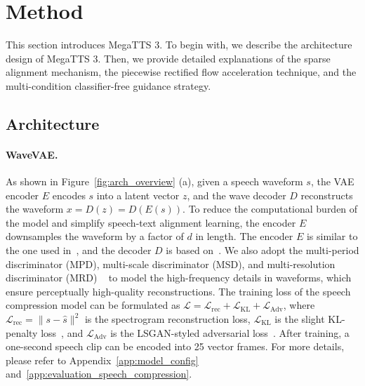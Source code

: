 \section{Method}
\label{method}
This section introduces MegaTTS 3. To begin with, we describe the architecture design of MegaTTS 3. Then, we provide detailed explanations of the sparse alignment mechanism, the piecewise rectified flow acceleration technique, and the multi-condition classifier-free guidance strategy.

\subsection{Architecture}
\label{method:main_arch}
\paragraph{WaveVAE.} As shown in Figure~\ref{fig:arch_overview} (a), given a speech waveform $s$, the VAE encoder $E$ encodes $s$ into a latent vector $z$, and the wave decoder $D$ reconstructs the waveform $x = D(z) = D(E(s))$. To reduce the computational burden of the model and simplify speech-text alignment learning, the encoder $E$ downsamples the waveform by a factor of $d$ in length. The encoder $E$ is similar to the one used in~\citet{ji2024wavtokenizer}, and the decoder $D$ is based on~\citet{kong2020hifi}. We also adopt the multi-period discriminator (MPD), multi-scale discriminator (MSD), and multi-resolution discriminator (MRD) ~\citep{kong2020hifi,jang2021univnet} to model the high-frequency details in waveforms, which ensure perceptually high-quality reconstructions. The training loss of the speech compression model can be formulated as $\mathcal{L} = \mathcal{L}_{\mathrm{rec}} + \mathcal{L}_{\mathrm{KL}} + \mathcal{L}_{\mathrm{Adv}}$, where $\mathcal{L}_{\mathrm{rec}}=\|s-\hat{s}\|^2$ is the spectrogram reconstruction loss, $\mathcal{L}_{\mathrm{KL}}$ is the slight KL-penalty loss~\citep{rombach2022high}, and $\mathcal{L}_{\mathrm{Adv}}$ is the LSGAN-styled adversarial loss~\citep{mao2017least}. After training, a one-second speech clip can be encoded into 25 vector frames. For more details, please refer to Appendix~\ref{app:model_config} and~\ref{app:evaluation_speech_compression}.

